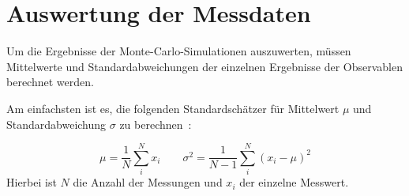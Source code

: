 		

	
	\section{Auswertung der Messdaten}
	\label{sec:theorieauswertung}
	Um die Ergebnisse der Monte-Carlo-Simulationen auszuwerten, müssen Mittelwerte und Standardabweichungen der einzelnen Ergebnisse der Observablen berechnet werden.
	
	Am einfachsten ist es, die folgenden Standardschätzer für Mittelwert $\mu$ und Standardabweichung $\sigma$ zu berechnen~\cite[vgl. ][S. 54 f.]{skriptcompphys}:
	
	\begin{equation}
	\mu=\frac{1}{N}\sum\limits_{i}^{N} x_i
	\qquad
	\sigma^2=\frac{1}{N-1}\sum\limits_{i}^{N}(x_i-\mu)^2
	\label{eq:standardmitteundfehler}
	\end{equation}
	Hierbei ist $N$ die Anzahl der Messungen und $x_i$ der einzelne Messwert.
	
	
	
